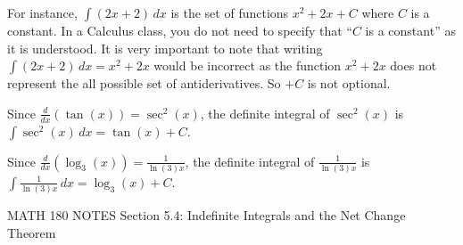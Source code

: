 \documentclass[12pt,letterpaper]{article}
\begin{document}
For instance, $\int (2x + 2) \, dx$ is the set of functions $x^2 + 2x + C$ where $C$ is a constant. In a Calculus class, you do not need to specify that ``$C$ is a constant'' as it is understood.
It is very important to note that writing $\int (2x + 2) \, dx = x^2 + 2x$ would be incorrect as the function $x^2 + 2x$ does not represent the all possible set of antiderivatives. So $+ C$ is not optional.

Since $\frac{d}{dx}(\tan(x)) = \sec^2(x)$, the definite integral of $\sec^2(x)$ is $\int \sec^2(x) \, dx = \tan(x) + C$.

Since $\frac{d}{dx}(\log_3(x)) = \frac{1}{\ln(3)x}$, the definite integral of $\frac{1}{\ln(3)x}$ is $\int \frac{1}{\ln(3)x} \, dx = \log_3(x) + C$.

\pagebreak

MATH 180 NOTES \hfill Section 5.4: Indefinite Integrals and the Net Change Theorem

\hrulefill
\end{document}
